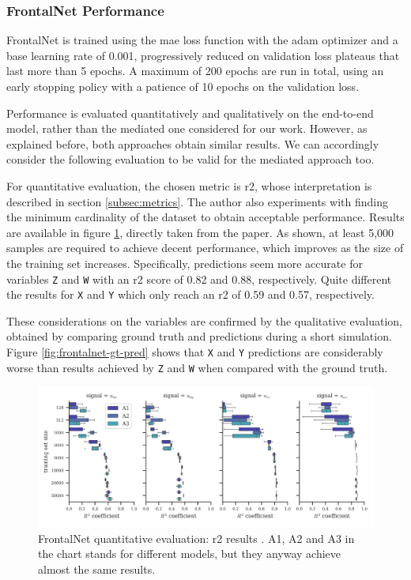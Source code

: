 \subsubsection{FrontalNet Performance}
\label{subsec:frontalnet-performance}


FrontalNet is trained using the \gls{mae} loss function with the \gls{adam} optimizer \cite{kingma2014adam} and a base learning rate of 0.001, progressively reduced on validation loss plateaus that last more than 5 epochs. A maximum of 200 epochs are run in total, using an early stopping policy with a patience of 10 epochs on the validation loss. 

Performance is evaluated quantitatively and qualitatively on the end-to-end model, rather than the mediated one considered for our work. However, as explained before, both approaches obtain similar results. We can accordingly consider the following evaluation to be valid for the mediated approach too.

\bigskip 

For quantitative evaluation, the chosen metric is \gls{r2}, whose interpretation is described in section \ref{subsec:metrics}. The author also experiments with finding the minimum cardinality of the dataset to obtain acceptable performance. Results are available in figure \ref{fig:frontalnet-r2}, directly taken from the paper. As shown, at least 5,000 samples are required to achieve decent performance, which improves as the size of the training set increases. Specifically, predictions seem more accurate for variables \texttt{Z} and \texttt{W} with an \gls{r2} score of 0.82 and 0.88, respectively. Quite different the results for \texttt{X} and \texttt{Y} which only reach an \gls{r2} of 0.59 and 0.57, respectively.

These considerations on the variables are confirmed by the qualitative evaluation, obtained by comparing ground truth and predictions during a short simulation. Figure \ref{fig:frontalnet-gt-pred} shows that \texttt{X} and \texttt{Y} predictions are considerably worse than results achieved by \texttt{Z} and \texttt{W} when compared with the ground truth.

\begin{figure}[!htb]
	\centering
	\includegraphics[width=1\textwidth]{"contents/images/03-frontalnet-r2"}
	\caption[FrontalNet quantitative evaluation: \gls{r2} results \cite{mantegazza2019visionbased}]{FrontalNet quantitative evaluation: \gls{r2} results \cite{mantegazza2019visionbased}. A1, A2 and A3 in the chart stands for different models, but they anyway achieve almost the same results.}
	\label{fig:frontalnet-r2}
\end{figure}

